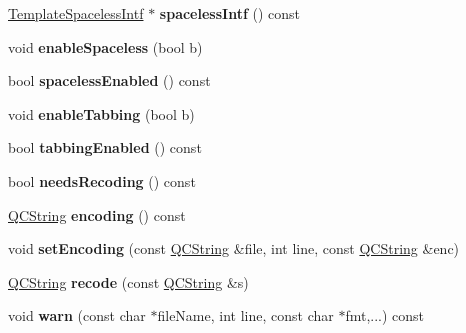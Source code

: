 \begin{DoxyCompactItemize}
\mbox{\hyperlink{class_template_spaceless_intf}{Template\+Spaceless\+Intf}} $\ast$ {\bfseries spaceless\+Intf} () const
\item 
\mbox{\label{class_template_context_impl_a0cbc1d21d6a36a04fec3bad7ac677330}} 
void {\bfseries enable\+Spaceless} (bool b)
\item 
\mbox{\label{class_template_context_impl_a51ef260b5ad8e51f4d1c0946211d4504}} 
bool {\bfseries spaceless\+Enabled} () const
\item 
\mbox{\label{class_template_context_impl_a1443d238fee209cf8a705258532e4444}} 
void {\bfseries enable\+Tabbing} (bool b)
\item 
\mbox{\label{class_template_context_impl_a26de74067c83cb2e297c2b8f1c2b57a5}} 
bool {\bfseries tabbing\+Enabled} () const
\item 
\mbox{\label{class_template_context_impl_a6559cfd611032a0d11acade316cf7b1e}} 
bool {\bfseries needs\+Recoding} () const
\item 
\mbox{\label{class_template_context_impl_a1b24ad1892cceaacf5e69063da01fcbe}} 
\mbox{\hyperlink{class_q_c_string}{Q\+C\+String}} {\bfseries encoding} () const
\item 
\mbox{\label{class_template_context_impl_a61eac0859ed4b50a8d0b996b1b2bba86}} 
void {\bfseries set\+Encoding} (const \mbox{\hyperlink{class_q_c_string}{Q\+C\+String}} \&file, int line, const \mbox{\hyperlink{class_q_c_string}{Q\+C\+String}} \&enc)
\item 
\mbox{\label{class_template_context_impl_ab8ea2d7cb44d90ec727586f9bf92369e}} 
\mbox{\hyperlink{class_q_c_string}{Q\+C\+String}} {\bfseries recode} (const \mbox{\hyperlink{class_q_c_string}{Q\+C\+String}} \&s)
\item 
\mbox{\label{class_template_context_impl_a6a520512bf255fc490ec350f27bd9017}} 
void {\bfseries warn} (const char $\ast$file\+Name, int line, const char $\ast$fmt,...) const

\end{DoxyCompactItemize}

